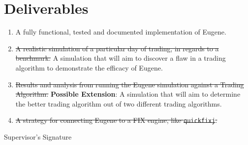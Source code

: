 \documentclass[10pt,a4paper]{article}
\begin{document}
\section*{Deliverables}
\begin{enumerate}
\item A fully functional, tested and documented implementation of Eugene.
\item \sout{A realistic simulation of a particular day of trading, in regards to a benchmark.} A simulation that will aim to discover a flaw in a trading algorithm to demonstrate the efficacy of Eugene. 
\item \sout{Results and analysis from running the Eugene simulation against a Trading Algorithm.} \textbf{Possible Extension}: A simulation that will aim to determine the better trading algorithm out of two different trading algorithms.  
\item \sout{A strategy for connecting Eugene to a FIX engine, like \texttt{quickfixj}.}
\end{enumerate}

\begin{flushright}
Supervisor's Signature\hspace{0.5cm} \makebox[1.5in]{\hrulefill}
\end{flushright}

\pagebreak


\end{document}
